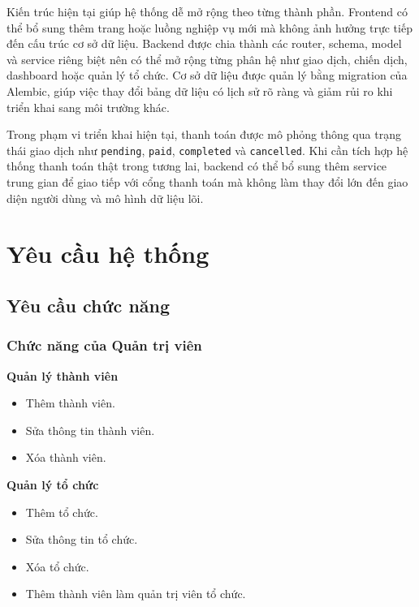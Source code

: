 \documentclass[12pt,a4paper]{report}
\begin{document}
Kiến trúc hiện tại giúp hệ thống dễ mở rộng theo từng thành phần. Frontend có
thể bổ sung thêm trang hoặc luồng nghiệp vụ mới mà không ảnh hưởng trực tiếp
đến cấu trúc cơ sở dữ liệu. Backend được chia thành các router, schema, model và
service riêng biệt nên có thể mở rộng từng phân hệ như giao dịch, chiến dịch,
dashboard hoặc quản lý tổ chức. Cơ sở dữ liệu được quản lý bằng migration của
Alembic, giúp việc thay đổi bảng dữ liệu có lịch sử rõ ràng và giảm rủi ro khi
triển khai sang môi trường khác.

Trong phạm vi triển khai hiện tại, thanh toán được mô phỏng thông qua trạng
thái giao dịch như \texttt{pending}, \texttt{paid}, \texttt{completed} và
\texttt{cancelled}. Khi cần tích hợp hệ thống thanh toán thật trong tương lai,
backend có thể bổ sung thêm service trung gian để giao tiếp với cổng thanh toán
mà không làm thay đổi lớn đến giao diện người dùng và mô hình dữ liệu lõi.

\FloatBarrier
\clearpage

\chapter{Yêu cầu hệ thống}

\section{Yêu cầu chức năng}

\subsection{Chức năng của Quản trị viên}

\textbf{Quản lý thành viên}
\begin{itemize}[label=--, leftmargin=1.2cm]
\item Thêm thành viên.
\item Sửa thông tin thành viên.
\item Xóa thành viên.
\end{itemize}

\textbf{Quản lý tổ chức}
\begin{itemize}[label=--, leftmargin=1.2cm]
\item Thêm tổ chức.
\item Sửa thông tin tổ chức.
\item Xóa tổ chức.
\item Thêm thành viên làm quản trị viên tổ chức.
\end{itemize}
\end{document}
